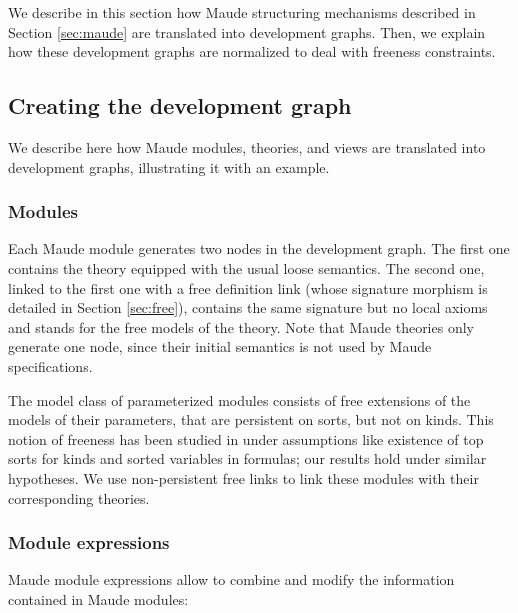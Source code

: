 
We describe in this section how Maude structuring mechanisms
described in Section \ref{sec:maude}
are translated into development graphs. Then, we explain how these development
graphs are normalized to deal with freeness constraints.

\subsection{Creating the development graph}
We describe here how Maude modules, theories, and views are translated into
development graphs, illustrating it with an example.

\subsubsection{Modules}

Each Maude module generates two nodes in the development
graph. The first one contains the theory equipped with the usual
loose semantics. The second one, linked
to the first one with a free definition link (whose signature morphism
is detailed in Section \ref{sec:free}), contains the same signature but
no local axioms and stands for the free models of the theory.
Note that Maude theories only generate one node, since their initial
semantics is not used by Maude specifications.

The model class of parameterized modules
consists of free extensions of the models of their parameters, that are
persistent on sorts, but not on kinds. This notion of freeness has been 
studied in \cite{BouhoulaJouannaudMeseguer00} under assumptions like existence of top sorts for kinds
and sorted variables in formulas; our results hold under similar
hypotheses. We use non-persistent free links to link these modules with
their corresponding theories.

\subsubsection{Module expressions}\label{subsec:me}

Maude module expressions allow to combine and modify the information
contained in Maude modules:

